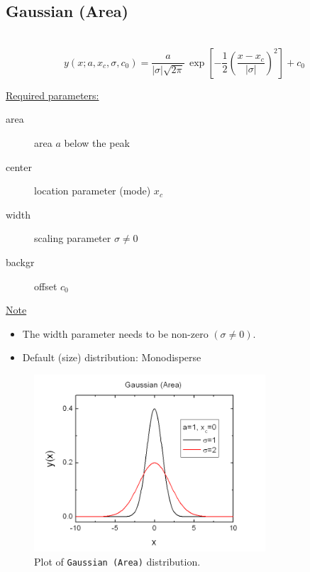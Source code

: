 \clearpage
\subsection{Gaussian (Area)} ~\\
\label{sec:GaussianNormalArea}
\begin{equation}
y(x;a,x_c,\sigma,c_0) = \frac{a}{|\sigma|\sqrt{2\pi}} \,
\exp\left[-\frac{1}{2}\left(\frac{x-x_c}{|\sigma|}\right)^2\right]
+c_0
\end{equation}
\vspace{5mm}

\underline{Required parameters:}
\begin{description}
    \item[area] area $a$ below the peak
    \item[center] location parameter (mode) $x_c$
    \item[width] scaling parameter $\sigma \neq 0$
    \item[backgr] offset $c_0$
\end{description}

\underline{Note}
\begin{itemize}
  \item The width parameter needs to be non-zero $(\sigma\neq 0)$.
  \item Default (size) distribution: Monodisperse
\end{itemize}
\begin{figure}[htb]
\begin{center}
\includegraphics[width=0.768\textwidth]{GaussianArea.png}
\end{center}
\caption{Plot of \texttt{Gaussian (Area)} distribution.}
\label{fig:GaussianArea}
\end{figure}


